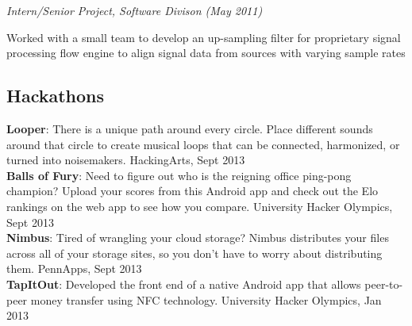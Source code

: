 \documentclass{article}
\newcommand{\position}[2]{
  \textit{#1 (#2)}
}
\newenvironment{achievements}{
  \begin{compactitem} }{
  \end{compactitem}
}
\newcommand{\skill}[2]{
  \textbf{#1}: #2
  \smallskip
}
\begin{document}
    \position {Intern/Senior Project, Software Divison} {May 2011}
    \begin{achievements}
      \item Worked with a small team to develop an up-sampling filter for
      proprietary signal processing flow engine to align signal data from sources
      with varying sample rates
    \end{achievements}

\subsection*{Hackathons}
  \skill{Looper}
        {There is a unique path around every circle. Place different sounds
        around that circle to create musical loops that can be connected,
        harmonized, or turned into noisemakers. HackingArts, Sept 2013}\\
  \skill{Balls of Fury}
        {Need to figure out who is the reigning office ping-pong champion?
        Upload your scores from this Android app and check out the Elo
        rankings on the web app to see how you compare. University Hacker
        Olympics, Sept 2013} \\
  \skill{Nimbus}
        {Tired of wrangling your cloud storage? Nimbus distributes your files
        across all of your storage sites, so you don't have to worry about
        distributing them. PennApps, Sept 2013} \\
  \skill{TapItOut}
      {Developed the front end of a native Android app that allows
      peer-to-peer money transfer using NFC technology. University Hacker
      Olympics, Jan 2013}

\begin{comment}
\subsection*{Projects}
  \skill{Type Inference}
        {Implemented Hindley-Milner type inference for a teaching language in
        ML. Wrote a constraint solver to assign types to correct terms and
        reject ill-typed terms.} \\
  \skill{TapItOut}
        {Developed the front end of a native Android app that allows
        peer-to-peer money transfer using NFC technology. Built at the 2013
        University Hacker Olympics in San Francisco.} \\
  \skill{Virtual Machine}
        {Designed and wrote a 32-bit virtual machine in C. Implemented a set of
        basic operations and a macro assembler to create executable binary
        files. Wrote a calculator program in assembly.}
\end{comment}
\end{document}
